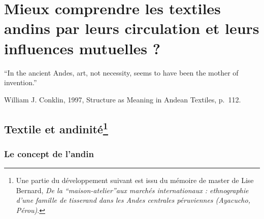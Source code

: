 \chapter{Mieux comprendre les textiles andins par leurs circulation et leurs influences mutuelles ?}
\markboth{}{}

\epigraph{\textquotedblleft In the ancient Andes, art, not necessity, seems to have been the mother of invention.\textquotedblright}{William J. Conklin, 1997, \og Structure as Meaning in Andean Textiles\fg, p.~112.}


\section[Textile et andinité]{Textile et andinité\footnote{Une partie du développement suivant est issu du mémoire de master de Lise Bernard, \textit{De la \textquotedblleft maison-atelier\textquotedblright aux marchés internationaux : ethnographie d'une famille de tisserand dans les Andes centrales péruviennes (Ayacucho, Pérou)}.}}

\subsection{Le concept de \og l'andin\fg}

